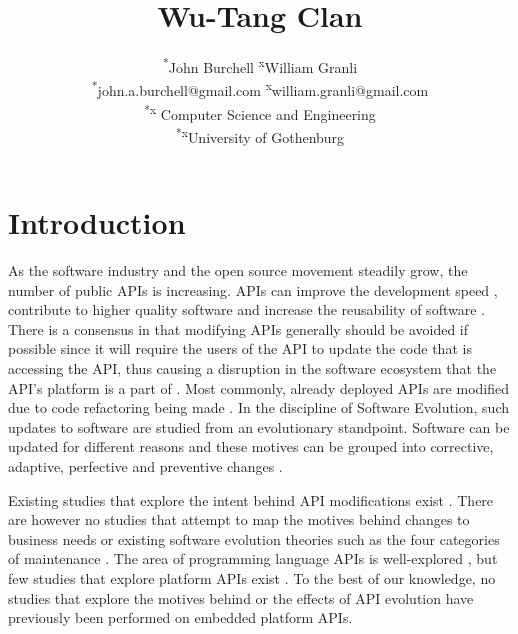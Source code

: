 \documentclass[10pt,twocolumn]{article}
\title{Wu-Tang Clan}
\begin{document}
\author{\textsuperscript{*}John Burchell \qquad \textsuperscript{x}William Granli \\
		\textsuperscript{*}john.a.burchell@gmail.com \qquad \textsuperscript{x}william.granli@gmail.com \\
		\textsuperscript{*x} Computer Science and Engineering  \\
		\textsuperscript{*x}University of Gothenburg }



\maketitle





\section{Introduction}
As the software industry and the open source movement steadily grow, the number of public APIs is increasing. APIs can improve the development speed \cite{stylos2006comparing}, contribute to higher quality software \cite{stylos2006comparing} and increase the reusability of software \cite{afonso2012evaluating}.  There is a consensus in that modifying APIs generally should be avoided if possible \cite{google_talk} \cite{mcdonnell2013empirical} \cite{robbes2012developers} \cite{henning2007api} \cite{robbes2012developers} since it will require the users of the API to update the code that is accessing the API, thus causing a disruption in the software ecosystem that the API's platform is a part of \cite{messerschmitt2005software}. Most commonly, already deployed APIs are modified due to code refactoring being made \cite{dig2005role} \cite{xing2006refactoring}. 
In the discipline of Software Evolution, such updates to software are studied from an evolutionary standpoint. Software can be updated for different reasons and these motives can be grouped into corrective, adaptive, perfective and preventive changes \cite{lientz1980software} \cite{iso}. 

Existing studies that explore the intent behind API modifications exist \cite{hou2011exploring}. There are however no studies that attempt to map the motives behind changes to business needs or existing software evolution theories such as the four categories of maintenance \cite{lientz1980software}. The area of programming language APIs is well-explored \cite{hou2011exploring} \cite{shi2011empirical}, but few studies that explore platform APIs exist \cite{robbes2012developers}. To the best of our knowledge, no studies that explore the motives behind or the effects of API evolution have previously been performed on embedded platform APIs. 
\end{document}
